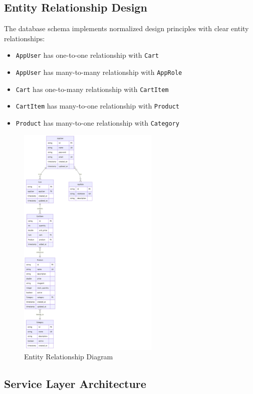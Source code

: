 \documentclass[12pt,a4paper]{article}
\begin{document}
\subsection{Entity Relationship Design}

The database schema implements normalized design principles with clear entity relationships:

\begin{itemize}
    \item \texttt{AppUser} has one-to-one relationship with \texttt{Cart}
    \item \texttt{AppUser} has many-to-many relationship with \texttt{AppRole}
    \item \texttt{Cart} has one-to-many relationship with \texttt{CartItem}
    \item \texttt{CartItem} has many-to-one relationship with \texttt{Product}
    \item \texttt{Product} has many-to-one relationship with \texttt{Category}
\end{itemize}


\begin{figure}[H]
    \centering
    \includegraphics[width=0.6\textwidth]{mld.png}
    \caption{Entity Relationship Diagram}
\end{figure}

\subsection{Service Layer Architecture}
\end{document}
